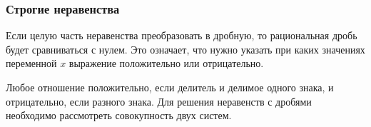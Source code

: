 \documentclass[algebra,twocolumn]{pum}
\begin{document}
%
%
%
%
%
%
%
\subsubsection*{Строгие неравенства}
Если целую часть неравенства преобразовать в дробную, то рациональная дробь будет сравниваться с нулем. Это означает, что нужно указать при каких значениях переменной $x$ выражение положительно или отрицательно. 

Любое отношение положительно, если делитель и делимое одного знака, и отрицательно, если разного знака. Для решения неравенств с дробями необходимо рассмотреть совокупность двух систем.
\end{document}
